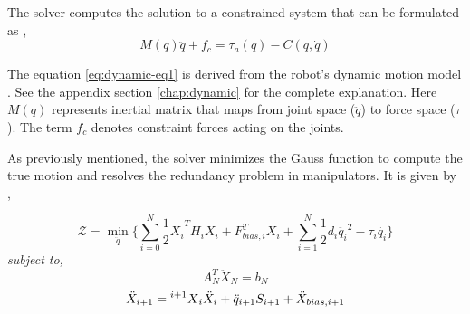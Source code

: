  The solver computes the solution to a constrained system that can be formulated as \cite{shakhimardanov2015composable}, 
 \begin{equation}\label{eq:dynamic-eq1}
		 M(q)\ddot{q} + f_c = \tau_a(q) - C(q, \dot{q})
 \end{equation}
 
 
 The equation \ref{eq:dynamic-eq1} is derived from the robot's dynamic motion model \cite{shakhimardanov2015composable}. See the appendix section \autoref{chap:dynamic} for the complete explanation.
 Here $M(q)$ represents inertial matrix that maps from joint space ($\ddot{q}$) to force space ($\tau$). The term  $f_c$ denotes constraint forces acting on the joints.
 
As previously mentioned, the solver minimizes the Gauss function to compute the true motion and resolves the redundancy problem in manipulators. It is given by \cite{vereshchagin1989modeling}, 

 


% 
 \begin{equation} \label{eq:gauss}
	\mathcal{Z} = \min_{\ddot{q}} \Big \{\sum_{i=0}^{N} \frac{1}{2} \ddot{X_i}^T H_i \ddot{X_i} + F_{bias, i}^T\ddot{X_i} + \sum_{i=1}^{N} \frac{1}{2} d_i \ddot{q_i}^2 - \tau_i \ddot{q_i} \Big \}
 \end{equation} 
\hspace{70pt}\textit{subject to,}
\begin{equation} \label{eq:constraint1}
A_N^T \ddot{X}_N = b_N
\end{equation} 
\begin{equation} \label{eq:constraint2}
\ddot{X}_{i+1} = \prescript{i+1}{}{X}_i \ddot{X}_i + \ddot{q}_{i+1} S_{i+1} + \ddot{X}_{bias, i+1}
\end{equation} 

